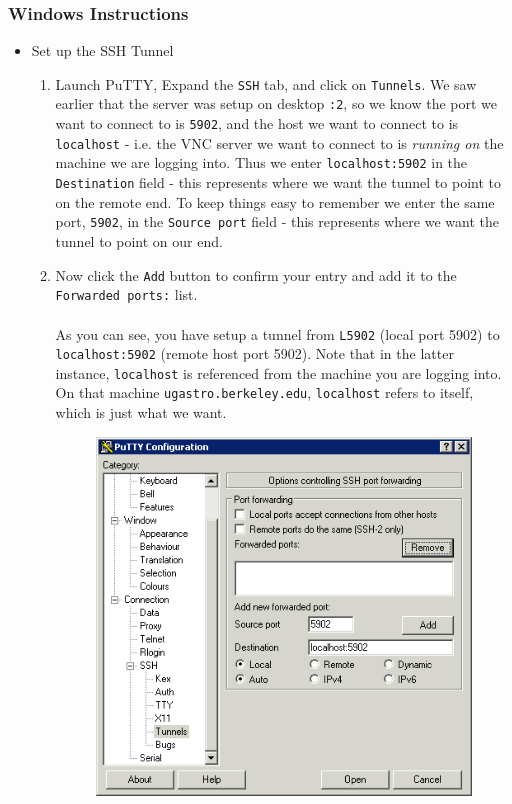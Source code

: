 \documentclass[11pt,preprint]{aastex}
\begin{document}
\subsubsection{Windows Instructions}
\begin{itemize}
\item Set up the SSH Tunnel
\begin{enumerate}
\item Launch PuTTY, Expand the \verb$SSH$ tab, and click on \verb$Tunnels$.  We saw earlier that the server was setup on desktop \verb$:2$, so we know the port
we want to connect to is \verb$5902$, and the host we want to connect to is \verb$localhost$ - i.e. the VNC server we want to connect to is \emph{running on} the machine
we are logging into.  Thus we enter \verb$localhost:5902$ in the \verb$Destination$ field - this represents where we want the tunnel to point to on the remote end.  To keep things easy to remember we enter the same port, \verb$5902$, in the \verb$Source port$ field - this represents where we want the tunnel to point on our end.
\\
\item Now click the \verb$Add$ button to confirm your entry and add it to the \verb$Forwarded ports:$ list.
\\
\\
As you can see, you have setup a tunnel from \verb$L5902$ (local port 5902) to \verb$localhost:5902$ (remote host port 5902).  Note that in the latter instance, 
\verb$localhost$ is referenced from the machine you are logging into.  On that machine \verb$ugastro.berkeley.edu$, \verb$localhost$ refers to itself, which is just what we want.
\\
\begin{figure}[h!]
\begin{center}
\includegraphics[scale=0.5]{putty1a.png}

\end{center}
\end{figure}
\end{enumerate}
\end{itemize}
\end{document}

